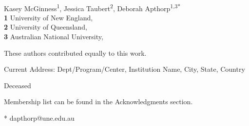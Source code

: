 \documentclass[
  10pt,
  letterpaper,
]{article}
\begin{document}
\vspace*{0.2in}

\begin{flushleft}
{\Large
\textbf{} %
}
\newline
\\
Kasey McGinness\textsuperscript{1}, Jessica
Taubert\textsuperscript{2}, Deborah Apthorp\textsuperscript{1,3*}
\\
\bigskip
\textbf{1} University of New England, \\ \textbf{2} University of
Queensland, \\ \textbf{3} Australian National University, 
\bigskip

% 
%
\Yinyang These authors contributed equally to this work.


\textcurrency Current Address: Dept/Program/Center, Institution Name, City, State, Country %

\dag Deceased

\textpilcrow Membership list can be found in the Acknowledgments section.

* dapthorp@une.edu.au

\end{flushleft}
\end{document}
